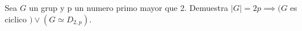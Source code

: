 \question 
Sea $G$ un grup y p un numero primo mayor que 2. 
Demuestra $|G|=2p \implies (G$ es ciclico $)\lor (G \simeq D_{2,p})$.